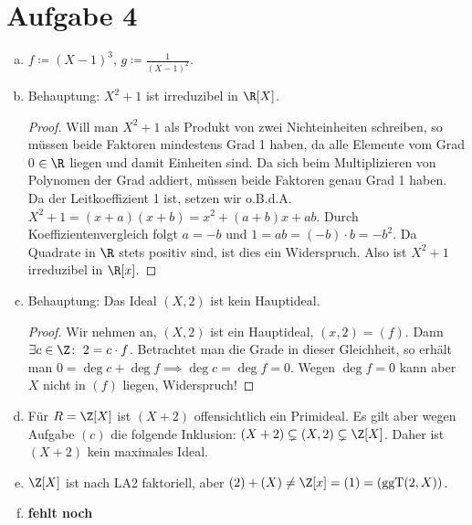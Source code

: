 \documentclass{article}
\begin{document}
    \section*{Aufgabe 4}
    \begin{enumerate}[(a)]
        \item $f \coloneqq (X -1)^3$, $g \coloneqq \frac{1}{(X-1)^2}$.
        \item Behauptung: $X^2 + 1$ ist irreduzibel in $\R[X]$. 
        \begin{proof}
            Will man $X^2 + 1$ als Produkt von zwei Nichteinheiten schreiben, so müssen beide Faktoren mindestens Grad 1 haben, da alle Elemente vom Grad 0 $\in \R$ liegen und damit Einheiten sind. Da sich beim Multiplizieren von Polynomen der Grad addiert, müssen beide Faktoren genau Grad 1 haben. Da der Leitkoeffizient 1 ist, setzen wir o.B.d.A. $X^2 + 1 = (x + a)(x + b) = x^2 + (a + b)x + ab$. Durch Koeffizientenvergleich folgt $a = -b$ und $1 = ab = (-b) \cdot b = -b^2$. Da Quadrate in $\R$ stets positiv sind, ist dies ein Widerspruch. Also ist $X^2 + 1$ irreduzibel in $\R[x]$.
        \end{proof}
        \item Behauptung: Das Ideal $(X,2)$ ist kein Hauptideal.
        \begin{proof}
            Wir nehmen an, $(X,2)$ ist ein Hauptideal, $(x, 2) = (f)$. Dann $\exists c\in \Z\colon\;2 = c\cdot f$. Betrachtet man die Grade in dieser Gleichheit, so erhält man $0 = \deg c + \deg f \implies \deg c = \deg f = 0$. Wegen $\deg f = 0$ kann aber $X$ nicht in $(f)$ liegen, Widerspruch!
        \end{proof}
        \item Für $R = \Z[X]$ ist $(X + 2)$ offensichtlich ein Primideal. Es gilt aber wegen Aufgabe $(c)$ die folgende Inklusion: $(X + 2) \subsetneq (X,2) \subsetneq \Z[X]$. Daher ist $(X + 2)$ kein maximales Ideal.
        \item $\Z[X]$ ist nach LA2 faktoriell, aber $(2) + (X) \neq \Z[x] = (1) = (\operatorname{ggT}(2, X))$.
        \item \textbf{fehlt noch}
    \end{enumerate}
\end{document}
